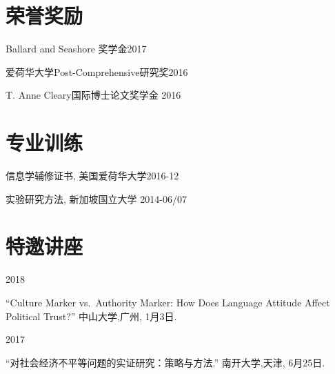 \documentclass[10.5pt,]{article}
\providecommand{\tightlist}{%
	\setlength{\itemsep}{0pt}\setlength{\parskip}{0pt}}
\renewenvironment{itemize}{
	\begin{list}{}{
			\setlength{\leftmargin}{1.5em}
		}
	}{
	\end{list}
}
\begin{document}
 \hypertarget{ux8363ux8a89ux5956ux52b1}{%
 \section{荣誉奖励}\label{ux8363ux8a89ux5956ux52b1}}

 \begin{itemize}
 \tightlist
 \item
   Ballard and Seashore 奖学金\hfill 2017
 \item
   爱荷华大学Post-Comprehensive研究奖\hfill 2016
 \item
   T. Anne Cleary国际博士论文奖学金 \hfill 2016
 \end{itemize}

 \hypertarget{ux4e13ux4e1aux8badux7ec3}{%
 \section{专业训练}\label{ux4e13ux4e1aux8badux7ec3}}

 \begin{itemize}
 \tightlist
 \item
   信息学辅修证书, 美国爱荷华大学\hfill 2016-12
 \item
   实验研究方法, 新加坡国立大学 \hfill 2014-06/07
 \end{itemize}

 \hypertarget{ux7279ux9080ux8bb2ux5ea7}{%
 \section{特邀讲座}\label{ux7279ux9080ux8bb2ux5ea7}}

 \begin{itemize}
 \tightlist
 \item
   2018

   \begin{itemize}
   \tightlist
   \item
     ``Culture Marker vs.~Authority Marker: How Does Language Attitude
     Affect Political Trust?'' 中山大学,广州, 1月3日.
   \end{itemize}
 \item
   2017

   \begin{itemize}
   \tightlist
   \item
     ``对社会经济不平等问题的实证研究：策略与方法.'' 南开大学,天津,
     6月25日.
   \end{itemize}
 \end{itemize}
\end{document}
